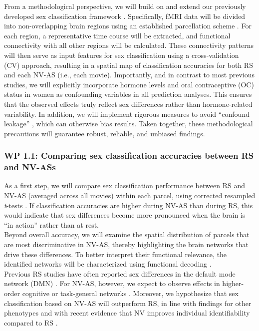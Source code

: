 \documentclass[11pt,a4paper]{article}
\begin{document}
From a methodological perspective, we will build on and extend our previously developed sex classification 
framework \parencite{weisSexClassificationResting2020a}. Specifically, fMRI data will be divided 
into non-overlapping brain regions using an established parcellation scheme \parencite{schaeferLocalGlobalParcellationHuman2018}. 
For each region, a representative time course will be extracted, and functional connectivity with all other regions will be calculated. 
These connectivity patterns will then serve as input features for sex classification using a cross-validation (CV) approach, 
resulting in a spatial map of classification accuracies for both RS and each NV-AS (i.e., each movie).
Importantly, and in contrast to most previous studies, we will explicitly incorporate hormone levels and oral contraceptive (OC) 
status in women as confounding variables in all prediction analyses. This ensures that the observed effects truly reflect 
sex differences rather than hormone-related variability. In addition, we will implement rigorous measures to avoid 
“confound leakage” \parencite{hamdanConfoundleakageConfoundRemoval2022a}, which can otherwise bias results. 
Taken together, these methodological precautions will guarantee robust, reliable, and unbiased findings.

\subsubsection*{WP 1.1:  Comparing sex classification accuracies between RS and NV-ASs}
As a first step, we will compare sex classification performance between RS and NV-AS (averaged across all movies) within each parcel, 
using corrected resampled \textit{t}-tests \parencite{nadeauInferenceGeneralizationError2003a}. 
If classification accuracies are higher during NV-AS than during RS, this would indicate that sex differences 
become more pronounced when the brain is “in action” rather than at rest.\\
Beyond overall accuracy, we will examine the spatial distribution of parcels that are most discriminative in NV-AS, 
thereby highlighting the brain networks that drive these differences. To better interpret their functional relevance, 
the identified networks will be characterized using functional decoding \parencite{foxMetaanalysisHumanNeuroimaging2014a}.\\
Previous RS studies have often reported sex differences in the default mode network (DMN) 
\parencite{weisSexClassificationResting2020a,zhangFunctionalConnectivityPredicts2018}. 
For NV-AS, however, we expect to observe effects in higher-order cognitive or task-general networks 
\parencite{hugdahlExistenceGeneralizedNonspecific2015a}. Moreover, we hypothesize that sex classification based on 
NV-AS will outperform RS, in line with findings for other 
phenotypes \parencite{finnCanBrainState2017a,vanderwalIndividualDifferencesFunctional2017} and with recent 
evidence that NV improves individual identifiability compared to RS \parencite{krollNaturalisticViewingIncreases2023}.
\end{document}
